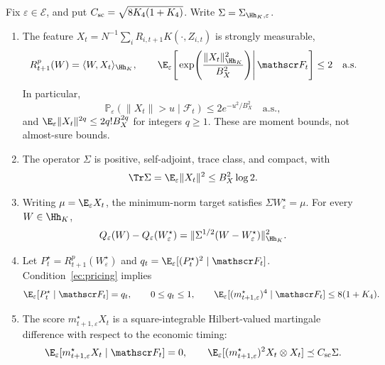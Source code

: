 \begin{lemma}
\label{lem:primitive_consequences}
Fix $\varepsilon\in\mathcal E$, and put
$C_{\rm sc}=\sqrt{8K_4(1+K_4)}$. Write $\Sigma=\Sigma_{\Hh_K,\varepsilon}$.
\begin{enumerate}[label=\textup{(\roman*)},leftmargin=*,itemsep=0.35em]
\item The feature $X_t=N^{-1}\sum_iR_{i,t+1}K(\cdot,Z_{i,t})$ is strongly
measurable,
\[
R^p_{t+1}(W)=\langle W,X_t\rangle_{\Hh_K},\qquad
\E_\varepsilon\!\left[
\left.
\exp\!\left(\frac{\|X_t\|_{\Hh_K}^2}{B_X^2}\right)
\right|\mathscr F_t
\right]\leq2
\quad\text{a.s.}
\]
In particular,
\[
\mathbb P_\varepsilon(\|X_t\|>u\mid\mathscr F_t)
\leq2e^{-u^2/B_X^2}
\quad\text{a.s.},
\]
and $\E_\varepsilon\|X_t\|^{2q}\leq2q!B_X^{2q}$ for integers $q\geq1$.
These are moment bounds, not almost-sure bounds.

\item The operator $\Sigma$ is positive, self-adjoint, trace class, and compact,
with
\[
\Tr\Sigma=\E_\varepsilon\|X_t\|^2\leq B_X^2\log2.
\]

\item Writing $\mu=\E_\varepsilon X_t$, the minimum-norm target satisfies
$\Sigma W^\star_\varepsilon=\mu$. For every $W\in\Hh_K$,
\[
Q_\varepsilon(W)-Q_\varepsilon(W^\star_\varepsilon)
=\|\Sigma^{1/2}(W-W^\star_\varepsilon)\|_{\Hh_K}^2.
\]

\item Let $P_t^\star=R^p_{t+1}(W^\star_\varepsilon)$ and
$q_t=\E_\varepsilon[(P_t^\star)^2\mid\mathscr F_t]$.
Condition~\ref{ec:pricing} implies
\[
\E_\varepsilon[P_t^\star\mid\mathscr F_t]=q_t,\qquad 0\leq q_t\leq1,
\qquad
\E_\varepsilon[(m^\star_{t+1,\varepsilon})^4\mid\mathscr F_t]
\leq8(1+K_4).
\]

\item The score $m^\star_{t+1,\varepsilon}X_t$ is a square-integrable
Hilbert-valued martingale difference with respect to the economic timing:
\[
\E_\varepsilon[m^\star_{t+1,\varepsilon}X_t\mid\mathscr F_t]=0,
\qquad
\E_\varepsilon[(m^\star_{t+1,\varepsilon})^2 X_t\otimes X_t]
\preceq C_{\rm sc}\Sigma.
\]
\end{enumerate}
\end{lemma}

